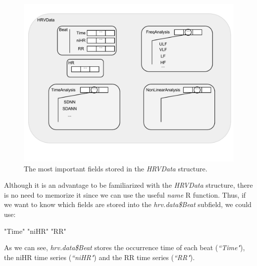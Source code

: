 \documentclass[12pt,lot, lof]{puthesis}
\begin{document}
\begin{figure}[h]
\centering
\includegraphics{figures/basicHRVData.pdf}
\caption{The most important fields stored in the \textit{HRVData} 
structure.\label{fig:dataScheme}}
\end{figure}
Although it is an advantage to be familiarized with the \textit{HRVData} 
structure, there is no need to memorize it since we can use the useful 
\textit{name} R function. Thus, if we want to know which fields are stored into 
the \textit{hrv.data\$Beat} subfield, we could use:

\begin{Schunk}
\begin{Soutput}
[1] "Time" "niHR" "RR"  
\end{Soutput}
\end{Schunk}

As we can see,  \textit{hrv.data\$Beat} stores the occurrence time of each beat 
(\textit{``Time"}), the \gls{niHR} time series (\textit{``niHR"}) and the RR 
time series (\textit{``RR"}).
\end{document}
